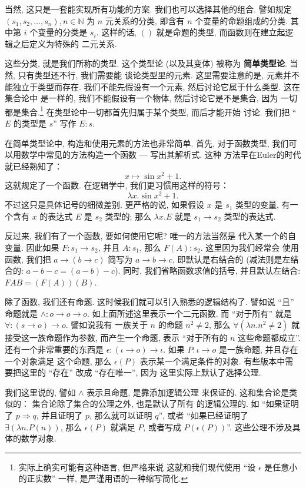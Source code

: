 \documentclass[UTF8]{ctexbook}
\theoremstyle{plain}
\theoremstyle{definition}
\theoremstyle{remark}
\begin{document}
当然, 这只是一套能实现所有功能的方案. 我们也可以选择其他的组合.
譬如规定 \((s_1, s_2, \dots, s_n), n\in\mathbb N\) 为
\(n\) 元关系的分类, 即含有 \(n\) 个变量的命题组成的分类.
其中第 \(i\) 个变量的分类是 \(s_i\). 这样的话,
\(()\) 就是命题的类型, 而函数则在建立起逻辑之后定义为特殊的
二元关系.

这些分类, 就是我们所称的类型. 这个类型论 (以及其变体) 被称为%
\textbf{简单类型论}. 当然, 只有类型还不行, 我们需要能
谈论类型里的元素. 这里需要注意的是, 元素并不能独立于类型而存在.
我们不能先假设有一个元素, 然后讨论它属于什么类型. 这在集合论中
是一样的, 我们不能假设有一个物体, 然后讨论它是不是集合, 因为
一切都是集合.\footnote{实际上确实可能有这种语言, 但严格来说
这就和我们现代使用 “设 \(\epsilon\) 是任意小的正实数” 一样,
是严谨用语的一种缩写简化.} 在类型论中一切都首先归属于某个类型, 而后才能开始
讨论. 我们把 “\(E\) 的类型是 \(s\)” 写作 \(E : s\).

在简单类型论中, 构造和使用元素的方法也非常简单. 首先, 对于函数类型,
我们可以用数学中常见的方法构造一个函数 --- 写出其解析式. 这种
方法早在Euler的时代就已经熟知了：
\[x \mapsto \sin x^2 + 1.\]
这就规定了一个函数. 在逻辑学中, 我们更习惯用这样的符号：
\[\lambda x. \sin x^2 + 1.\]
不过这只是具体记号的细微差别. 更严格的说, 如果假设 \(x\) 是
\(s_1\) 类型的变量, 有一个含有 \(x\) 的表达式 \(E\) 是
\(s_2\) 类型的; 那么 \(\lambda x. E\) 就是 \(s_1 \to s_2\)
类型的表达式.

反过来, 我们有了一个函数, 要如何使用它呢? 唯一的方法当然是
代入某一个的自变量. 因此如果 \(F : s_1 \to s_2\), 并且
\(A : s_1\), 那么 \(F(A) : s_2\). 这里因为我们经常会
使用函数, 我们把 \(a \to (b \to c)\) 简写为 \(a \to b \to c\),
即默认是右结合的 (减法则是左结合的: \(a - b - c = (a - b) - c\)).
同时, 我们省略函数求值的括号, 并且默认左结合: \(FAB = (F(A))(B)\).

除了函数, 我们还有命题. 这时候我们就可以引入熟悉的逻辑结构了.
譬如说 “且” 命题就是 \(\wedge : o \to o \to o\).
如上面所述这里表示一个二元函数. 而 “对于所有” 就是
\(\forall : (s \to o) \to o\). 譬如说我有
一族关于 \(n\) 的命题 \(n^2 \ne 2\),
那么 \(\forall (\lambda n. n^2 \ne 2)\)
就接受这一族命题作为参数, 而产生一个命题, 表示 “对于所有的
\(n\) 这些命题都成立”. 还有一个非常重要的东西是
\(\epsilon : (\iota \to o) \to \iota\). 如果
\(P : \iota \to o\) 是一族命题, 并且存在一个对象满足
这个命题, 那么 \(\epsilon(P)\) 表示某一个满足条件的对象.
有些版本中需要把这里的 “存在” 改成 “存在唯一”, 因为
这里实际上默认了选择公理.

我们这里说的, 譬如 \(\wedge\) 表示且命题, 是靠添加逻辑公理
来保证的. 这和集合论是类似的： 集合论除了集合的公理之外,
也是默认了所有
的逻辑公理的. 如 “如果证明了 \(p \Rightarrow q\), 并且证明了
\(p\), 那么就可以证明 \(q\)”, 或者 “如果已经证明了 \(\exists
(\lambda n. P(n))\), 那么 \(\epsilon(P)\) 就满足 \(P\),
或者写成 \(P(\epsilon(P))\)”.
这些公理不涉及具体的数学对象.
\end{document}
